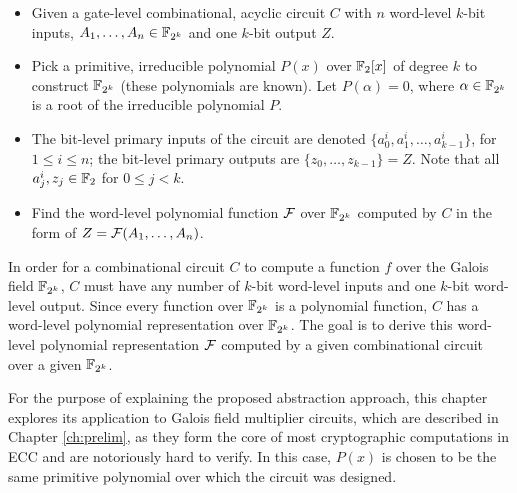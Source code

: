 \begin{itemize}
\item  Given a gate-level combinational, acyclic circuit $C$ with $n$ word-level
$k$-bit inputs,
$A_1,\dots, A_n \in {\mathbb{F}}_{2^k}$
and one $k$-bit output $Z$.
\item Pick a primitive, irreducible polynomial $P(x)$ over ${\mathbb{F}}_2[x]$ of degree $k$ 
to construct ${\mathbb{F}}_{2^k}$ (these polynomials are known).
Let $P(\alpha) = 0$, where $\alpha \in {\mathbb{F}}_{2^k}$ is a root of the irreducible
polynomial $P$.
\item The bit-level primary inputs of the circuit are denoted
$\{a_{0}^{i},a_{1}^{i},\dots,a_{k-1}^{i}\}$, for $1\leq i \leq n$;
the bit-level primary outputs are $\{z_0, \dots, z_{k-1}\} = Z$. 
Note that all $a_{j}^{i}, z_j \in {\mathbb{F}}_2$ for $0\leq j < k$.
\item Find the word-level polynomial function ${\mathcal{F}}$ over ${\mathbb{F}}_{2^k}$ 
computed by $C$ in the form of $Z={\mathcal{F}}(A_1, \dots, A_n)$.
\end{itemize}

In order for a combinational circuit $C$ to compute a function $f$ over the 
Galois field ${\mathbb{F}}_{2^k}$, $C$ must have any number of 
$k$-bit word-level inputs and one $k$-bit word-level output.
Since every function over ${\mathbb{F}}_{2^k}$ is a polynomial function, 
$C$ has a word-level polynomial representation over ${\mathbb{F}}_{2^k}$.
The goal is to derive this word-level polynomial representation ${\mathcal{F}}$ 
computed by a given combinational circuit over a 
given ${\mathbb{F}}_{2^k}$.

For the purpose of explaining the proposed abstraction approach, 
this chapter explores its application to Galois field multiplier circuits, 
which are described in Chapter \ref{ch:prelim}, 
as they form the core of most cryptographic computations in ECC and are 
notoriously hard to verify. In this case, $P(x)$ is chosen to be the same
primitive polynomial over which the circuit was designed.

